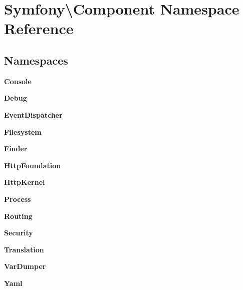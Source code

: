 \section{Symfony\textbackslash{}Component Namespace Reference}
\label{namespace_symfony_1_1_component}
\subsection*{Namespaces}
\begin{DoxyCompactItemize}
\item 
 {\bf Console}
\item 
 {\bf Debug}
\item 
 {\bf Event\+Dispatcher}
\item 
 {\bf Filesystem}
\item 
 {\bf Finder}
\item 
 {\bf Http\+Foundation}
\item 
 {\bf Http\+Kernel}
\item 
 {\bf Process}
\item 
 {\bf Routing}
\item 
 {\bf Security}
\item 
 {\bf Translation}
\item 
 {\bf Var\+Dumper}
\item 
 {\bf Yaml}
\end{DoxyCompactItemize}
